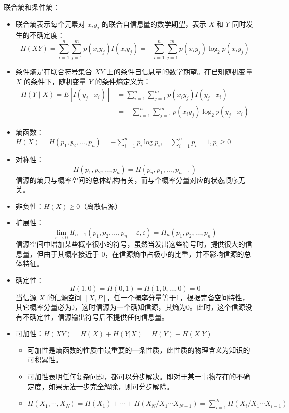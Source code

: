 \begin{remark}
    联合熵和条件熵：
    \begin{itemize}
        \item 联合熵表示每个元素对 $x_iy_j$ 的联合自信息量的数学期望，表示 $X$ 和 $Y$ 同时发生的不确定度：\[H(XY) = \sum_{i = 1}^n\sum_{j = 1}^m p(x_iy_j)I(x_iy_j) = -\sum_{i = 1}^n\sum_{j = 1}^m p(x_iy_j)\log_2 p(x_iy_j)\]
        \item 条件熵是在联合符号集合 $XY$ 上的条件自信息量的数学期望。在已知随机变量 $X$ 的条件下，随机变量 $Y$ 的条件熵定义为：\begin{align*}
            H(Y \mid X) = E[I(y_j \mid x_i)] &= \sum_{i = 1}^n\sum_{j = 1}^m p(x_iy_j)I(y_j \mid x_i)\\
            &= -\sum_{i = 1}^n\sum_{j = 1}^m p(x_iy_j) \log_2 p(y_j \mid x_i)
        \end{align*}
        \item 熵函数：$H(X) = H(p_1, p_2, \dots, p_n) = -\sum_{i = 1}^np_i\log p_i, \quad \sum_{i = 1}^np_i = 1, p_i \ge 0$
        \item 对称性：\[H(p_1, p_2, \dots, p_n) = H(p_n, p_1, \dots, p_{n - 1})\] 信源的熵只与概率空间的总体结构有关，而与个概率分量对应的状态顺序无关。
        \item 非负性：$H(X) \ge 0$（离散信源）
        \item 扩展性：\[\lim_{\varepsilon \to 0} H_{n+1}(p_{1}, p_{2}, \ldots, p_{n}-\varepsilon, \varepsilon)=H_{n}(p_{1}, p_{2}, \ldots, p_{n})\]
        信源空间中增加某些概率很小的符号，虽然当发出这些符号时，提供很大的信息量，但由于其概率接近于 0，在信源熵中占极小的比重，并不影响信源的总体特征。
        \item 确定性：\[H(1, 0) = H(0, 1) = H(1, 0, \dots, 0) = 0\] 当信源 $X$ 的信源空间 $[X, P]$，任一个概率分量等于1，根据完备空间特性， 其它概率分量必为0，这时信源为一个确知信源，其熵为0。此时，这个信源没有不确定性，信源输出符号后不提供任何信息量。
        \item 可加性：$H(XY) = H(X) + H(Y | X) = H(Y) + H(X | Y)$ \begin{itemize}
            \item 可加性是熵函数的性质中最重要的一条性质，此性质的物理含义为知识的可积累性。
            \item 可加性表明任何复杂问题，都可以分步解决。即对于某一事物存在的不确定度，如果无法一步完全解除，则可分步解除。
            \item $H(X_1, \cdots, X_N) = H(X_1) + \cdots + H(X_N / X_1\cdots X_{N - 1}) = \sum_{i = 1}^NH(X_i / X_1\cdots X_{i - 1})$

\end{itemize}
\end{itemize}
\end{remark}
